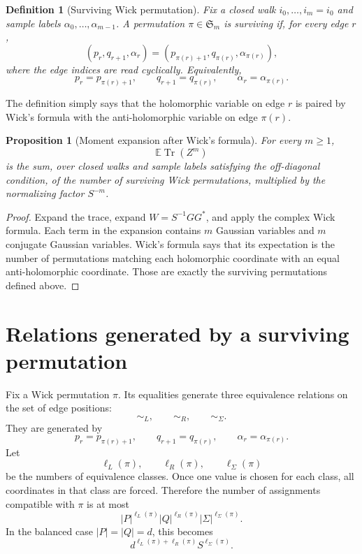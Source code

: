 \documentclass[11pt,oneside]{book}
\newtheorem{proposition}[theorem]{Proposition}
\newtheorem{definition}[theorem]{Definition}
\DeclareMathOperator{\Tr}{Tr}
\newcommand{\E}{\mathbb E}
\newcommand{\1}{\mathbf 1}
\begin{document}
\begin{definition}[Surviving Wick permutation]
Fix a closed walk \(i_0,\ldots,i_m=i_0\) and sample labels
\(\alpha_0,\ldots,\alpha_{m-1}\).  A permutation
\(\pi\in\mathfrak S_m\) is surviving if, for every edge \(r\),
\[
  (p_r,q_{r+1},\alpha_r)
  =
  (p_{\pi(r)+1},q_{\pi(r)},\alpha_{\pi(r)}),
\]
where the edge indices are read cyclically.  Equivalently,
\[
  p_r=p_{\pi(r)+1},\qquad
  q_{r+1}=q_{\pi(r)},\qquad
  \alpha_r=\alpha_{\pi(r)}.
\]
\end{definition}

The definition simply says that the holomorphic variable on edge \(r\) is
paired by Wick's formula with the anti-holomorphic variable on edge
\(\pi(r)\).

\begin{proposition}[Moment expansion after Wick's formula]
For every \(m\ge1\),
\[
  \E\Tr(Z^m)
\]
is the sum, over closed walks and sample labels satisfying the off-diagonal
condition, of the number of surviving Wick permutations, multiplied by the
normalizing factor \(S^{-m}\).
\end{proposition}

\begin{proof}
Expand the trace, expand \(W=S^{-1}GG^*\), and apply the complex Wick formula.
Each term in the expansion contains \(m\) Gaussian variables and \(m\)
conjugate Gaussian variables.  Wick's formula says that its expectation is the
number of permutations matching each holomorphic coordinate with an equal
anti-holomorphic coordinate.  Those are exactly the surviving permutations
defined above.
\end{proof}

\section{Relations generated by a surviving permutation}

Fix a Wick permutation \(\pi\).  Its equalities generate three equivalence
relations on the set of edge positions:
\[
  \sim_L,\qquad \sim_R,\qquad \sim_\Sigma.
\]
They are generated by
\[
  p_r=p_{\pi(r)+1},\qquad
  q_{r+1}=q_{\pi(r)},\qquad
  \alpha_r=\alpha_{\pi(r)}.
\]
Let
\[
  \ell_L(\pi),\qquad \ell_R(\pi),\qquad \ell_\Sigma(\pi)
\]
be the numbers of equivalence classes.  Once one value is chosen for each
class, all coordinates in that class are forced.  Therefore the number of
assignments compatible with \(\pi\) is at most
\[
  |P|^{\ell_L(\pi)}
  |Q|^{\ell_R(\pi)}
  |\Sigma|^{\ell_\Sigma(\pi)}.
\]
In the balanced case \(|P|=|Q|=d\), this becomes
\[
  d^{\ell_L(\pi)+\ell_R(\pi)}
  S^{\ell_\Sigma(\pi)}.
\]
\end{document}
